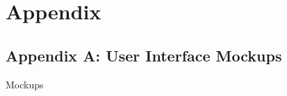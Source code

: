 \chapter{Appendix}

\captionsetup[figure]{list=no}

\section{Appendix A: User Interface
Mockups}\label{appendix-a-user-interface-mockups}

Mockups

